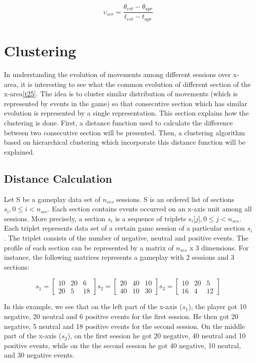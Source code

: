 $$ \upsilon_{scr} = \frac{\theta_{evt}-\theta_{apr}}{\textit{t}_{evt}-\textit{t}_{apr}} $$

\section{Clustering}

In understanding the evolution of movements among different sessions over x-area, it is interesting to see what the common evolution of different section of the x-area\ref{t25}. The idea is to cluster similar distribution of movements (which is represented by events in the game) so that consecutive section which has similar evolution is represented by a single representation. This section explains how the clustering is done. First, a distance function used to calculate the difference between two consecutive section will be presented. Then, a clustering algorithm based on hierarchical clustering which incorporate this distance function will be explained.

\subsection{Distance Calculation}
Let S be a gameplay data set of $n_{ses}$ sessions. S is an ordered list of sections $s_i, 0 \le i < n_{sec}$. Each section contains events occurred on an x-axis unit among all sessions. More precisely, a  section $s_i$ is a sequence of triplets $s_i\lbrack j \rbrack, 0 \le j < n_{ses}$. Each triplet represents data set of a certain game session of a particular section $s_i$. The triplet consists of the number of negative, neutral and positive events. The profile of each section can be represented by a matrix of $n_{ses}$ x 3 dimensions. For instance, the following matrices represents a gameplay with 2 sessions and 3 sections:

\[
\textit{s}_1 = \begin{bmatrix}
  10 & 20 & 6\\
  20 & 5 & 18
\end{bmatrix}
\textit{s}_2 = \begin{bmatrix}
  20 & 40 & 10\\ 
  40 & 10 & 30
\end{bmatrix}
\textit{s}_3 = \begin{bmatrix}
  10 & 20 & 5\\
  16 & 4 & 12 
\end{bmatrix}
\]

In this example, we see that on the left part of the x-axis ($s_1$), the player got 10 negative, 20 neutral and 6 positive events for the first session. He then got 20 negative, 5 neutral and 18 positive events for the second session. On the middle part of the x-axis ($s_2$), on the first session he got 20 negative, 40 neutral and 10 positive events, while on the the second session he got 40 negative, 10 neutral, and 30 negative events.

